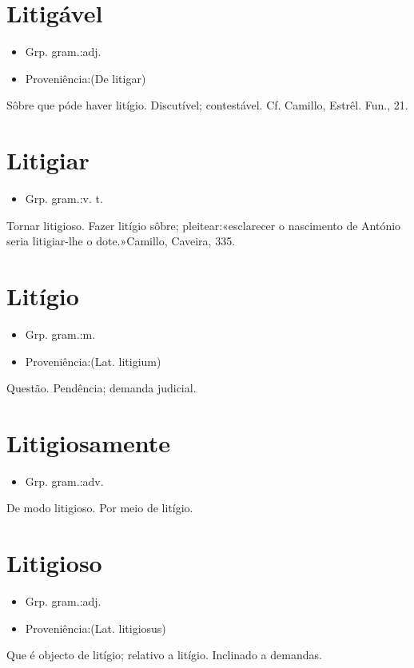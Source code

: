 \section{Litigável}
\begin{itemize}
\item {Grp. gram.:adj.}
\end{itemize}
\begin{itemize}
\item {Proveniência:(De \textunderscore litigar\textunderscore )}
\end{itemize}
Sôbre que póde haver litígio.
Discutível; contestável. Cf. Camillo, \textunderscore Estrêl. Fun.\textunderscore , 21.
\section{Litigiar}
\begin{itemize}
\item {Grp. gram.:v. t.}
\end{itemize}
Tornar litigioso.
Fazer litígio sôbre; pleitear:«\textunderscore esclarecer o nascimento de António seria litigiar-lhe o dote.\textunderscore »Camillo, \textunderscore Caveira\textunderscore , 335.
\section{Litígio}
\begin{itemize}
\item {Grp. gram.:m.}
\end{itemize}
\begin{itemize}
\item {Proveniência:(Lat. \textunderscore litigium\textunderscore )}
\end{itemize}
Questão.
Pendência; demanda judicial.
\section{Litigiosamente}
\begin{itemize}
\item {Grp. gram.:adv.}
\end{itemize}
De modo litigioso.
Por meio de litígio.
\section{Litigioso}
\begin{itemize}
\item {Grp. gram.:adj.}
\end{itemize}
\begin{itemize}
\item {Proveniência:(Lat. \textunderscore litigiosus\textunderscore )}
\end{itemize}
Que é objecto de litígio; relativo a litígio.
Inclinado a demandas.

